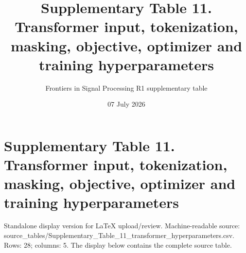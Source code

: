 \documentclass[11pt]{article}
\title{Supplementary Table 11. Transformer input, tokenization, masking, objective, optimizer and training hyperparameters}
\author{Frontiers in Signal Processing R1 supplementary table}
\date{07 July 2026}
\begin{document}
\maketitle

\section*{Supplementary Table 11. Transformer input, tokenization, masking, objective, optimizer and training hyperparameters}

Standalone display version for LaTeX upload/review. Machine-readable source: source\_\allowbreak{}tables/\allowbreak{}Supplementary\_\allowbreak{}Table\_\allowbreak{}11\_\allowbreak{}transformer\_\allowbreak{}hyperparameters.\allowbreak{}csv. Rows: 28; columns: 5. The display below contains the complete source table.
\end{document}
